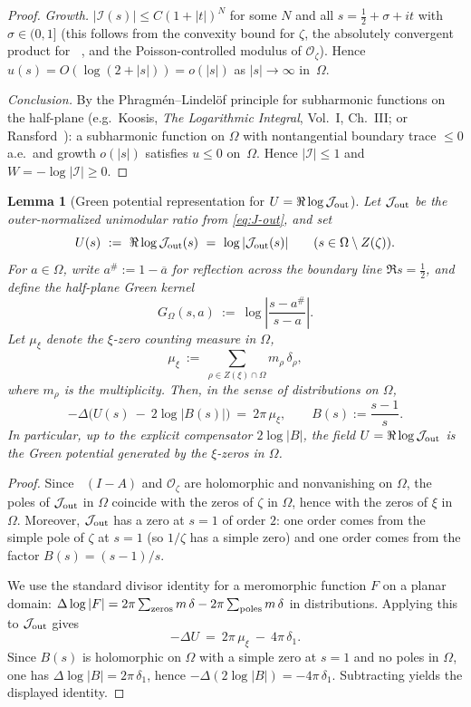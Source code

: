 \documentclass[11pt]{amsart}
\newtheorem{lemma}[theorem]{Lemma}
\theoremstyle{definition}
\theoremstyle{remark}
\DeclareMathOperator{\dettwo}{det_2}
\begin{document}
\begin{proof}
\emph{Growth.}
\(|\mathcal I(s)|\le C(1+|t|)^N\) for some \(N\) and all
\(s=\tfrac12+\sigma+it\) with \(\sigma\in(0,1]\)
(this follows from the convexity bound for \(\zeta\),
the absolutely convergent product for \(\dettwo\),
and the Poisson-controlled modulus of \(\mathcal O_\zeta\)).
Hence \(u(s)=O(\log(2+|s|))=o(|s|)\) as \(|s|\to\infty\) in~\(\Omega\).

\emph{Conclusion.}
By the Phragm\'en--Lindel\"of principle for subharmonic functions
on the half-plane
(e.g.\ Koosis, \emph{The Logarithmic Integral}, Vol.~I, Ch.~III;
or Ransford~\cite[Thm.~5.3.4]{RansfordPT}):
a subharmonic function on \(\Omega\) with nontangential boundary trace \(\le 0\) a.e.\
and growth \(o(|s|)\) satisfies \(u\le 0\) on~\(\Omega\).
Hence \(|\mathcal I|\le 1\) and \(W=-\log|\mathcal I|\ge 0\).
\end{proof}

\begin{lemma}[Green potential representation for \(U=\Re\log\mathcal J_{\rm out}\)]\label{lem:green-potential-Jout}
Let \(\mathcal J_{\rm out}\) be the outer-normalized unimodular ratio from \eqref{eq:J-out}, and set
\[
  U(s)\ :=\ \Re\log \mathcal J_{\rm out}(s)\ =\ \log|\mathcal J_{\rm out}(s)|
  \qquad (s\in \Omega\setminus Z(\zeta)).
\]
For \(a\in\Omega\), write \(a^\#:=1-\overline a\) for reflection across the boundary line \(\Re s=\tfrac12\), and define the half-plane Green kernel
\[
  G_\Omega(s,a)\ :=\ \log\left|\frac{s-a^\#}{s-a}\right|.
\]
Let \(\mu_\xi\) denote the \(\xi\)-zero counting measure in \(\Omega\),
\[
  \mu_\xi\ :=\ \sum_{\rho\in Z(\xi)\cap\Omega} m_\rho\,\delta_\rho,
\]
where \(m_\rho\) is the multiplicity.
Then, in the sense of distributions on \(\Omega\),
\[
  -\Delta\Big(U(s)\ -\ 2\log|B(s)|\Big)\ =\ 2\pi\,\mu_\xi,
  \qquad B(s):=\frac{s-1}{s}.
\]
In particular, up to the explicit compensator \(2\log|B|\), the field \(U=\Re\log \mathcal J_{\rm out}\) is the Green potential generated by the \(\xi\)-zeros in \(\Omega\).
\end{lemma}
\begin{proof}
Since \(\dettwo(I-A)\) and \(\mathcal O_\zeta\) are holomorphic and nonvanishing on \(\Omega\), the poles of \(\mathcal J_{\rm out}\) in \(\Omega\) coincide with the zeros of \(\zeta\) in \(\Omega\), hence with the zeros of \(\xi\) in \(\Omega\).
Moreover, \(\mathcal J_{\rm out}\) has a zero at \(s=1\) of order \(2\): one order comes from the simple pole of \(\zeta\) at \(s=1\) (so \(1/\zeta\) has a simple zero) and one order comes from the factor \(B(s)=(s-1)/s\).

We use the standard divisor identity for a meromorphic function \(F\) on a planar domain:
\(\Delta\log|F| = 2\pi\sum_{\textup{zeros}} m\,\delta - 2\pi\sum_{\textup{poles}} m\,\delta\)
in distributions.
Applying this to \(\mathcal J_{\rm out}\) gives
\[
  -\Delta U \ =\ 2\pi\,\mu_\xi\ -\ 4\pi\,\delta_{1}.
\]
Since \(B(s)\) is holomorphic on \(\Omega\) with a simple zero at \(s=1\) and no poles in \(\Omega\), one has \(\Delta\log|B| = 2\pi\,\delta_{1}\), hence
\(-\Delta(2\log|B|)=-4\pi\,\delta_{1}\).
Subtracting yields the displayed identity.
\end{proof}
\end{document}
